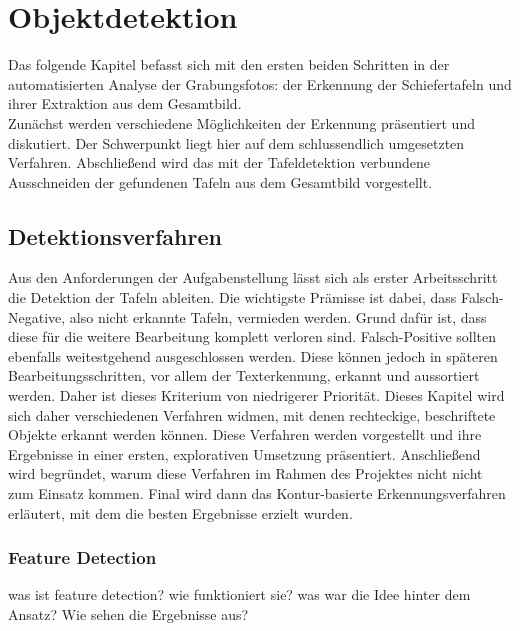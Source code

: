 \section{Objektdetektion}

Das folgende Kapitel befasst sich mit den ersten beiden Schritten in der automatisierten Analyse der Grabungsfotos: der Erkennung der Schiefertafeln und ihrer Extraktion aus dem Gesamtbild.\\
Zunächst werden verschiedene Möglichkeiten der Erkennung präsentiert und diskutiert. Der Schwerpunkt liegt hier auf dem schlussendlich umgesetzten Verfahren.
Abschließend wird das mit der Tafeldetektion verbundene Ausschneiden der gefundenen Tafeln aus dem Gesamtbild vorgestellt.

\subsection{Detektionsverfahren}

Aus den Anforderungen der Aufgabenstellung lässt sich als erster Arbeitsschritt die Detektion der Tafeln ableiten. Die wichtigste Prämisse ist dabei, dass Falsch-Negative, also nicht erkannte Tafeln, vermieden werden. Grund dafür ist, dass diese für die weitere Bearbeitung komplett verloren sind. Falsch-Positive sollten ebenfalls weitestgehend ausgeschlossen werden. Diese können jedoch in späteren Bearbeitungsschritten, vor allem der Texterkennung, erkannt und aussortiert werden. Daher ist dieses Kriterium von niedrigerer Priorität.
Dieses Kapitel wird sich daher verschiedenen Verfahren widmen, mit denen rechteckige, beschriftete Objekte erkannt werden können. Diese Verfahren werden vorgestellt und ihre Ergebnisse in einer ersten, explorativen Umsetzung präsentiert. Anschließend wird begründet, warum diese Verfahren im Rahmen des Projektes nicht nicht zum Einsatz kommen. Final wird dann das Kontur-basierte Erkennungsverfahren erläutert, mit dem die besten Ergebnisse erzielt wurden.


\subsubsection{Feature Detection}

was ist feature detection?
wie funktioniert sie?
was war die Idee hinter dem Ansatz?
Wie sehen die Ergebnisse aus?


